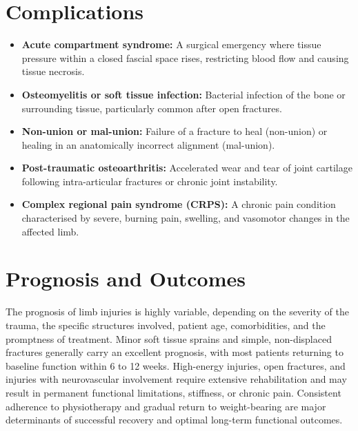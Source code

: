 \section*{Complications}
\begin{itemize}
    \item \textbf{Acute compartment syndrome:} A surgical emergency where tissue pressure within a closed fascial space rises, restricting blood flow and causing tissue necrosis.
    \item \textbf{Osteomyelitis or soft tissue infection:} Bacterial infection of the bone or surrounding tissue, particularly common after open fractures.
    \item \textbf{Non-union or mal-union:} Failure of a fracture to heal (non-union) or healing in an anatomically incorrect alignment (mal-union).
    \item \textbf{Post-traumatic osteoarthritis:} Accelerated wear and tear of joint cartilage following intra-articular fractures or chronic joint instability.
    \item \textbf{Complex regional pain syndrome (CRPS):} A chronic pain condition characterised by severe, burning pain, swelling, and vasomotor changes in the affected limb.
\end{itemize}

\section*{Prognosis and Outcomes}
The prognosis of limb injuries is highly variable, depending on the severity of the trauma, the specific structures involved, patient age, comorbidities, and the promptness of treatment. Minor soft tissue sprains and simple, non-displaced fractures generally carry an excellent prognosis, with most patients returning to baseline function within 6 to 12 weeks. High-energy injuries, open fractures, and injuries with neurovascular involvement require extensive rehabilitation and may result in permanent functional limitations, stiffness, or chronic pain. Consistent adherence to physiotherapy and gradual return to weight-bearing are major determinants of successful recovery and optimal long-term functional outcomes.

